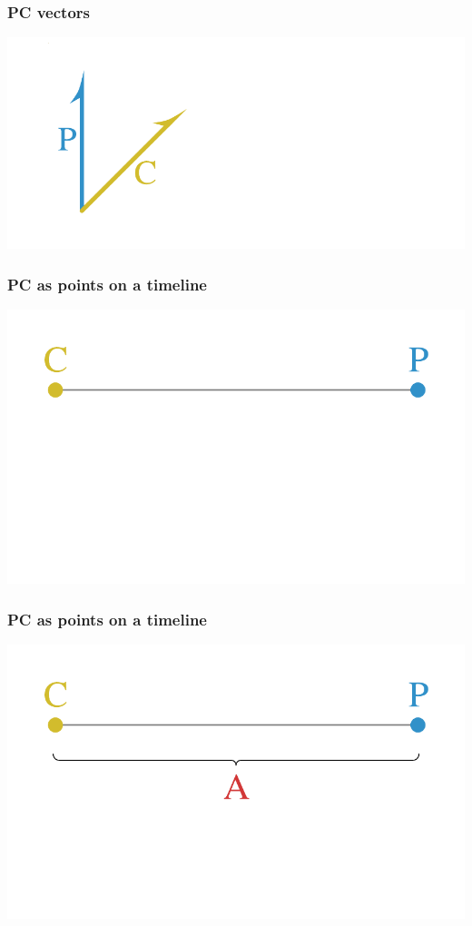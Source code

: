 \documentclass[20pt]{beamer}
\begin{document}
\begin{frame}
\frametitle{PC vectors}
\includegraphics[scale=1.5]{Figures/LexisStripped2.pdf}\\
\end{frame}

\begin{frame}
\frametitle{PC as points on a timeline}
\includegraphics[scale=1.5]{Figures/PCline0.pdf}\\
\end{frame}

\begin{frame}
\frametitle{PC as points on a timeline}
\centering
\includegraphics[scale=1.5]{Figures/PCline1.pdf}\\
\end{frame}
\end{document}
